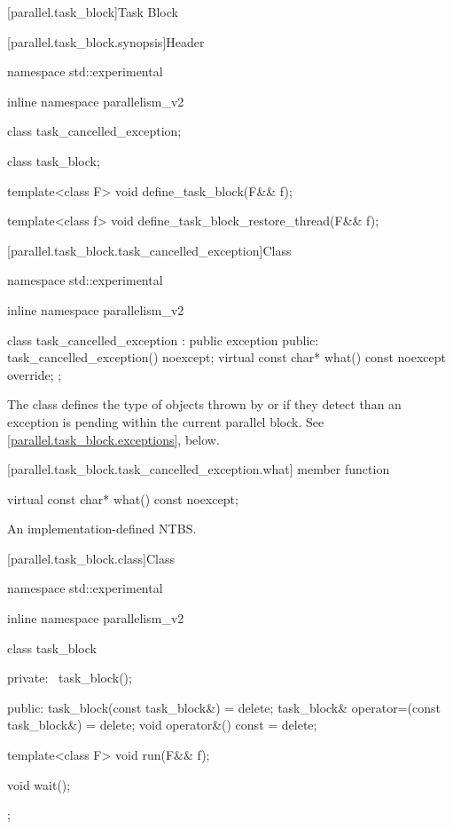 
[parallel.task_block]{Task Block}

[parallel.task_block.synopsis]{Header }

\begin{codeblock}
namespace std::experimental {
inline namespace parallelism_v2 {
  class task_cancelled_exception;

  class task_block;

  template<class F>
    void define_task_block(F&& f);

  template<class f>
    void define_task_block_restore_thread(F&& f);
}
}
\end{codeblock}

[parallel.task_block.task_cancelled_exception]{Class }

\begin{codeblock}
namespace std::experimental {
inline namespace parallelism_v2 {

  class task_cancelled_exception : public exception
  {
  public:
    task_cancelled_exception() noexcept;
    virtual const char* what() const noexcept override;
  };
}
}
\end{codeblock}

\pnum
The class  defines the type of objects
thrown by  or  if they detect
than an exception is pending within the current parallel block. See
\ref{parallel.task_block.exceptions}, below.

[parallel.task_block.task_cancelled_exception.what]{ member function }

\begin{itemdecl}
virtual const char* what() const noexcept;
\end{itemdecl}

\begin{itemdescr}
\pnum
\returns An implementation-defined NTBS.
\end{itemdescr}

[parallel.task_block.class]{Class }

\begin{codeblock}
namespace std::experimental {
inline namespace parallelism_v2 {

  class task_block
  {
  private:
    ~task_block();

  public:
    task_block(const task_block&) = delete;
    task_block& operator=(const task_block&) = delete;
    void operator&() const = delete;

    template<class F>
      void run(F&& f);

    void wait();
  };
}
}
\end{codeblock}

